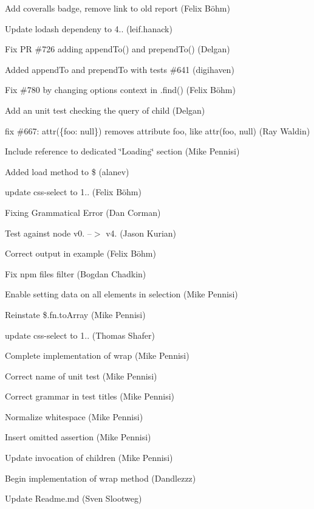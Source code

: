 
\begin{DoxyItemize}
\item Add coveralls badge, remove link to old report (Felix Böhm)
\item Update lodash dependeny to 4.. (leif.\+hanack)
\item Fix PR \#726 adding \textquotesingle{}append\+To()\textquotesingle{} and \textquotesingle{}prepend\+To()\textquotesingle{} (Delgan)
\item Added append\+To and prepend\+To with tests \#641 (digihaven)
\item Fix \#780 by changing options context in \textquotesingle{}.find()\textquotesingle{} (Felix Böhm)
\item Add an unit test checking the query of child (Delgan)
\item fix \#667\+: attr(\{foo\+: null\}) removes attribute foo, like attr(\textquotesingle{}foo\textquotesingle{}, null) (Ray Waldin)
\item Include reference to dedicated \char`\"{}\+Loading\char`\"{} section (Mike Pennisi)
\item Added load method to \$ (alanev)
\item update css-\/select to 1.. (Felix Böhm)
\item Fixing Grammatical Error (Dan Corman)
\item Test against node v0. --$>$ v4. (Jason Kurian)
\item Correct output in example (Felix Böhm)
\item Fix npm files filter (Bogdan Chadkin)
\item Enable setting data on all elements in selection (Mike Pennisi)
\item Reinstate {\ttfamily \$.fn.\+to\+Array} (Mike Pennisi)
\item update css-\/select to 1.. (Thomas Shafer)
\item Complete implementation of {\ttfamily wrap} (Mike Pennisi)
\item Correct name of unit test (Mike Pennisi)
\item Correct grammar in test titles (Mike Pennisi)
\item Normalize whitespace (Mike Pennisi)
\item Insert omitted assertion (Mike Pennisi)
\item Update invocation of {\ttfamily children} (Mike Pennisi)
\item Begin implementation of {\ttfamily wrap} method (Dandlezzz)
\item Update Readme.\+md (Sven Slootweg)

\end{DoxyItemize}
